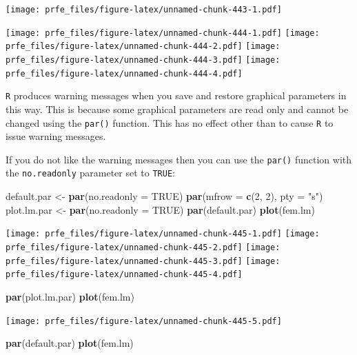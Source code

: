 \documentclass[12pt,a4paper]{book}
\newenvironment{Shaded}{\begin{snugshade}}{\end{snugshade}}
\newcommand{\KeywordTok}[1]{\textcolor[rgb]{0.13,0.29,0.53}{\textbf{#1}}}
\newcommand{\DataTypeTok}[1]{\textcolor[rgb]{0.13,0.29,0.53}{#1}}
\newcommand{\DecValTok}[1]{\textcolor[rgb]{0.00,0.00,0.81}{#1}}
\newcommand{\StringTok}[1]{\textcolor[rgb]{0.31,0.60,0.02}{#1}}
\newcommand{\OtherTok}[1]{\textcolor[rgb]{0.56,0.35,0.01}{#1}}
\newcommand{\NormalTok}[1]{#1}
\theoremstyle{definition}
\theoremstyle{definition}
\theoremstyle{definition}
\theoremstyle{remark}
\begin{document}
\texttt{[image: prfe\_files/figure-latex/unnamed-chunk-443-1.pdf]}

\texttt{[image: prfe\_files/figure-latex/unnamed-chunk-444-1.pdf]}
\texttt{[image: prfe\_files/figure-latex/unnamed-chunk-444-2.pdf]}
\texttt{[image: prfe\_files/figure-latex/unnamed-chunk-444-3.pdf]}
\texttt{[image: prfe\_files/figure-latex/unnamed-chunk-444-4.pdf]}

\texttt{R} produces warning messages when you save and restore graphical
parameters in this way. This is because some graphical parameters are
read only and cannot be changed using the \texttt{par()} function. This
has no effect other than to cause \texttt{R} to issue warning messages.

If you do not like the warning messages then you can use the
\texttt{par()} function with the \texttt{no.readonly} parameter set to
\texttt{TRUE}:

\begin{Shaded}
\begin{Highlighting}[]
\NormalTok{default.par <-}\StringTok{ }\KeywordTok{par}\NormalTok{(}\DataTypeTok{no.readonly =} \OtherTok{TRUE}\NormalTok{)}
\KeywordTok{par}\NormalTok{(}\DataTypeTok{mfrow =} \KeywordTok{c}\NormalTok{(}\DecValTok{2}\NormalTok{, }\DecValTok{2}\NormalTok{), }\DataTypeTok{pty =} \StringTok{"s"}\NormalTok{)}
\NormalTok{plot.lm.par <-}\StringTok{ }\KeywordTok{par}\NormalTok{(}\DataTypeTok{no.readonly =} \OtherTok{TRUE}\NormalTok{)}
\KeywordTok{par}\NormalTok{(default.par)}
\KeywordTok{plot}\NormalTok{(fem.lm)}
\end{Highlighting}
\end{Shaded}

\texttt{[image: prfe\_files/figure-latex/unnamed-chunk-445-1.pdf]}
\texttt{[image: prfe\_files/figure-latex/unnamed-chunk-445-2.pdf]}
\texttt{[image: prfe\_files/figure-latex/unnamed-chunk-445-3.pdf]}
\texttt{[image: prfe\_files/figure-latex/unnamed-chunk-445-4.pdf]}

\begin{Shaded}
\begin{Highlighting}[]
\KeywordTok{par}\NormalTok{(plot.lm.par)}
\KeywordTok{plot}\NormalTok{(fem.lm)}
\end{Highlighting}
\end{Shaded}

\texttt{[image: prfe\_files/figure-latex/unnamed-chunk-445-5.pdf]}

\begin{Shaded}
\begin{Highlighting}[]
\KeywordTok{par}\NormalTok{(default.par)}
\KeywordTok{plot}\NormalTok{(fem.lm)}
\end{Highlighting}
\end{Shaded}
\end{document}
